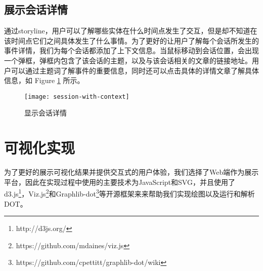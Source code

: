 \subsection{展示会话详情}
通过storyline，用户可以了解哪些实体在什么时间点发生了交互，但是却不知道在该时间点它们之间具体发生了什么事情。为了更好的让用户了解每个会话所发生的事件详情，我们为每个会话都添加了上下文信息。当鼠标移动到会话位置，会出现一个弹框，弹框内包含了该会话的主题，以及与该会话相关的文章的链接地址。用户可以通过主题词了解事件的重要信息，同时还可以点击具体的详情文章了解具体信息，如 Figure \ref{fig:session-with-context} 所示。
\begin{figure}[!htb]
	\centering
		\texttt{[image: session-with-context]}
	\caption{显示会话详情}
	\label{fig:session-with-context}
\end{figure}

\section{可视化实现}
为了更好的展示可视化结果并提供交互式的用户体验，我们选择了Web端作为展示平台，因此在实现过程中使用的主要技术为JavaScript和SVG，并且使用了d3.js\footnote{http://d3js.org/}，Viz.js\footnote{https://github.com/mdaines/viz.js}和Graphlib-dot\footnote{https://github.com/cpettitt/graphlib-dot/wiki}等开源框架来来帮助我们实现绘图以及运行和解析DOT。
